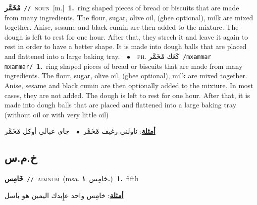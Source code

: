 \documentclass[10pt,a4paper,twoside]{article} %
\begin{document}
\begin{multicols}{2}
{\setlength\topsep{0pt}\textbf{\foreignlanguage{arabic}{مْخَمَّر}}\ {\color{gray}\texttt{//}\color{black}}\ \textsc{noun}\ [m.]\ \textbf{1.}~ring shaped pieces of bread or biscuits that are made from many ingredients. The flour, sugar, olive oil, (ghee optional), milk are mixed together. Anise, sesame and black cumin are then added to the mixture. The dough is left to rest for one hour. After that, they strech it and leave it again to rest in order to have a better shape. It is made into dough balls that are placed and flattened into a large baking tray.\ \ $\bullet$\ \ \textsc{ph.} \color{gray} \foreignlanguage{arabic}{كَعَك مْخَمَّر}\color{black}\ {\color{gray}\texttt{/{\sffamily mxammar mxammar}/}\color{black}}\ \textbf{1.}~ring shaped pieces of bread or biscuits that are made from many ingredients. The flour, sugar, olive oil, (ghee optional), milk are mixed together. Anise, sesame and black cumin are then optionally added to the mixture. In most cases, they are not added. The dough is left to rest for one hour. After that, it is made into dough balls that are placed and flattened into a large baking tray (without oil or with very little oil)\  \begin{flushright}\color{gray}\foreignlanguage{arabic}{\textbf{\underline{\foreignlanguage{arabic}{أمثلة}}}: ناولني رغيف مْخَمَّر\ $\bullet$\ \  جاي عبالي أوكل مْخَمَّر}\end{flushright}\color{black}} \vspace{2mm}

\vspace{-3mm}
\subsection*{\color{blue}\foreignlanguage{arabic}{خ.م.س}\color{blue}{}} 

{\setlength\topsep{0pt}\textbf{\foreignlanguage{arabic}{خَامِس}}\ {\color{gray}\texttt{//}\color{black}}\ \textsc{adj\textunderscore num}\ \color{gray}(msa. \foreignlanguage{arabic}{خامِس}~\foreignlanguage{arabic}{\textbf{١.}})\color{black}\ \textbf{1.}~fifth\  \begin{flushright}\color{gray}\foreignlanguage{arabic}{\textbf{\underline{\foreignlanguage{arabic}{أمثلة}}}: خامِس واحد عإِيدك اليمين هو باسل}\end{flushright}\color{black}} \vspace{2mm}


\end{multicols}
\end{document}
